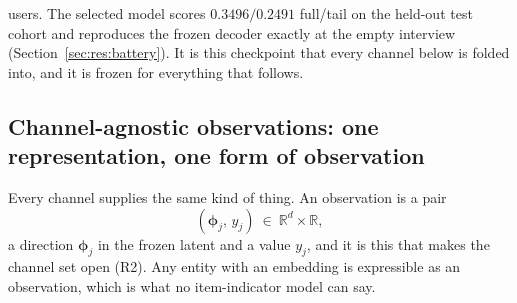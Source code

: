 \documentclass[manuscript,screen,review]{acmart}
\newcommand{\R}{\mathbb{R}}
\newcommand{\bphi}{\boldsymbol{\phi}}
\begin{document}
users. The selected model scores $0.3496/0.2491$ full/tail on the held-out test cohort and reproduces the frozen decoder exactly at the empty interview (Section~\ref{sec:res:battery}). It is this checkpoint that every channel below is folded into, and it is frozen for everything that follows.

\subsection{Channel-agnostic observations: one representation, one form of observation}
Every channel supplies the same kind of thing. An observation is a pair
\begin{equation}\label{eq:obs}
  (\bphi_j,\,y_j)\ \in\ \R^{d}\times\R,
\end{equation}
a direction $\bphi_j$ in the frozen latent and a value $y_j$, and it is this that makes the channel set open (R2). Any entity with an embedding is expressible as an observation, which is what no item-indicator model can say.
\end{document}
